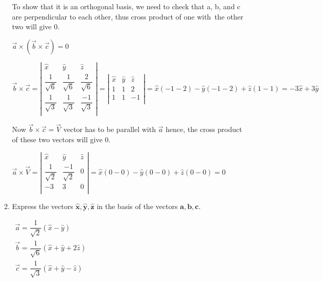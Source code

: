 \documentclass[fleqn]{article}
\begin{document}
\begin{enumerate}
\begin{enumerate}
  \bigbreak
  
  To show that it is an orthogonal basis, we need to check that a, b, and c are perpendicular to each other, thus cross product of one with the other two will give 0.
  
  \bigbreak
  
  $
  \overrightarrow{a}\times(\overrightarrow{b}\times\overrightarrow{c})=0
  $
  
  $
  \overrightarrow{b}\times\overrightarrow{c}
  =
  \left|
  \begin{matrix}
    \hat{x} & \hat{y} & \hat{z} \\
    \dfrac{1}{\sqrt{6}} & \dfrac{1}{\sqrt{6}} & \dfrac{2}{\sqrt{6}} \\ 
    \dfrac{1}{\sqrt{3}} & \dfrac{1}{\sqrt{3}} & \dfrac{-1}{\sqrt{3}} \\ 
  \end{matrix}
  \right|
  =
  \left|
  \begin{matrix}
    \hat{x} & \hat{y} & \hat{z} \\
    1 & 1 & 2 \\ 
    1 & 1 & -1 \\ 
  \end{matrix}
  \right|
  =
  \hat{x}(-1-2)-\hat{y}(-1-2)+\hat{z}(1-1)
  =
  -3\hat{x}+3\hat{y}
  $
  
  Now $\overrightarrow{b}\times\overrightarrow{c}=\overrightarrow{V}$ vector has to be parallel with $\overrightarrow{a}$ hence, the cross product of these two vectors will give 0.
  
  $
  \overrightarrow{a}\times\overrightarrow{V}
  =
  \left|
  \begin{matrix}
    \hat{x} & \hat{y} & \hat{z} \\
    \dfrac{1}{\sqrt{2}} & \dfrac{-1}{\sqrt{2}} & 0  \\ 
    -3 & 3 & 0 \\ 
  \end{matrix}
  \right|
  =
  \hat{x}(0-0)-\hat{y}(0-0)+\hat{z}(0-0)
  =
  0
  $
  
  \item Express the vectors $\mathbf{\hat{x}}, \mathbf{\hat{y}}, \mathbf{\hat{z}}$ in the basis of the vectors $\mathbf{a}, \mathbf{b}, \mathbf{c}$. 
  
  $
  \begin{array}{lll}
    \overrightarrow{a}= \dfrac{1}{\sqrt{2}}(\hat{x}-\hat{y}) \\
    \overrightarrow{b}= \dfrac{1}{\sqrt{6}}(\hat{x}+\hat{y}+2\hat{z}) \\
    \overrightarrow{c}= \dfrac{1}{\sqrt{3}}(\hat{x}+\hat{y}-\hat{z})
    \end{array}  
  $
  

\end{enumerate}
\end{enumerate}
\end{document}
